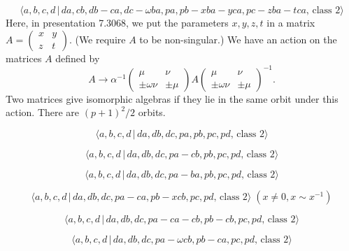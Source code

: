 \documentclass[10pt]{article}
\begin{document}
\begin{equation}
\langle a,b,c,d\,|\,da,cb,db-ca,dc-\omega ba,pa,pb-xba-yca,pc-zba-tca,\,%
\text{class }2\rangle  \tag{7.3068}
\end{equation}%
Here, in presentation 7.3068, we put the parameters $x,y,z,t$ in a matrix $%
A=\left( 
\begin{array}{ll}
x & y \\ 
z & t%
\end{array}%
\right) $. (We require $A$ to be non-singular.) We have an action on the
matrices $A$ defined by%
\[
A\rightarrow \alpha ^{-1}\left( 
\begin{array}{ll}
\mu & \nu \\ 
\pm \omega \nu & \pm \mu%
\end{array}%
\right) A\left( 
\begin{array}{ll}
\mu & \nu \\ 
\pm \omega \nu & \pm \mu%
\end{array}%
\right) ^{-1}. 
\]%
Two matrices give isomorphic algebras if they lie in the same orbit under
this action. There are $(p+1)^{2}/2$ orbits.

\begin{equation}
\langle a,b,c,d\,|\,da,db,dc,pa,pb,pc,pd,\,\text{class }2\rangle 
\tag{7.3069}
\end{equation}

\begin{equation}
\langle a,b,c,d\,|\,da,db,dc,pa-cb,pb,pc,pd,\,\text{class }2\rangle 
\tag{7.3070}
\end{equation}

\begin{equation}
\langle a,b,c,d\,|\,da,db,dc,pa-ba,pb,pc,pd,\,\text{class }2\rangle 
\tag{7.3071}
\end{equation}

\begin{equation}
\langle a,b,c,d\,|\,da,db,dc,pa-ca,pb-xcb,pc,pd,\,\text{class }2\rangle \;(x
\neq 0, x \sim x^{-1})  \tag{7.3072}
\end{equation}

\begin{equation}
\langle a,b,c,d\,|\,da,db,dc,pa-ca-cb,pb-cb,pc,pd,\,\text{class }2\rangle 
\tag{7.3073}
\end{equation}

\begin{equation}
\langle a,b,c,d\,|\,da,db,dc,pa-\omega cb,pb-ca,pc,pd,\,\text{class }2\rangle
\tag{7.3074}
\end{equation}
\end{document}
